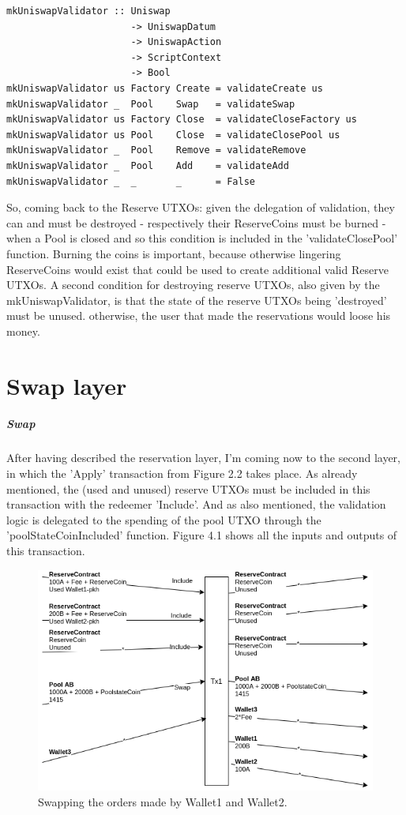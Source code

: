 \documentclass[a4paper,twoside,12pt]{report}
\begin{document}
\begin{verbatim}
mkUniswapValidator :: Uniswap
                      -> UniswapDatum
                      -> UniswapAction
                      -> ScriptContext
                      -> Bool
mkUniswapValidator us Factory Create = validateCreate us
mkUniswapValidator _  Pool    Swap   = validateSwap 
mkUniswapValidator us Factory Close  = validateCloseFactory us
mkUniswapValidator us Pool    Close  = validateClosePool us
mkUniswapValidator _  Pool    Remove = validateRemove
mkUniswapValidator _  Pool    Add    = validateAdd
mkUniswapValidator _  _       _      = False
\end{verbatim}

So, coming back to the Reserve UTXOs: given the delegation of validation, they can and must be destroyed - respectively their ReserveCoins must be burned - when a Pool is closed and so this condition is included in the 'validateClosePool' function. Burning the coins is important, because otherwise lingering ReserveCoins would exist that could be used to create additional valid Reserve UTXOs. A second condition for destroying reserve UTXOs, also given by the mkUniswapValidator, is that the state of the reserve UTXOs being 'destroyed' must be unused. otherwise, the user that made the reservations would loose his money.

\chapter{Swap layer}

\paragraph{Swap} After having described the reservation layer, I'm coming now to the second layer, in which the 'Apply' transaction from Figure 2.2 takes place. As already mentioned, the (used and unused) reserve UTXOs must be included in this transaction with the redeemer 'Include'. And as also mentioned, the validation logic is delegated to the spending of the pool UTXO through the 'poolStateCoinIncluded' function. Figure 4.1 shows all the inputs and outputs of this transaction.

\begin{figure}[h]
\centering
\includegraphics[scale=0.6]{swapWithoutSwapContract}
\caption{Swapping the orders made by Wallet1 and Wallet2.}
\end{figure} 
\end{document}
